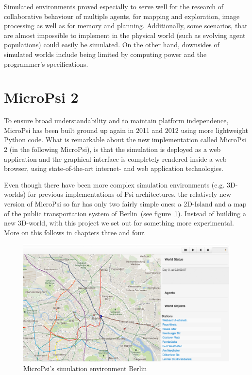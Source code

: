 Simulated environments proved especially to serve well for the research of collaborative behaviour of multiple agents, for mapping and exploration, image processing as well as for memory and planning. Additionally, some scenarios, that are almost impossible to implement in the physical world (such as evolving agent populations) could easily be simulated. On the other hand, downsides of simulated worlds include being limited by computing power and the programmer's specifications.~\cite{Bach:2009:PSI:1611304}

    \section{MicroPsi 2}
    \label{sec:2:MicroPsi}
To ensure broad understandability and to maintain platform independence, MicroPsi has been built ground up again in 2011 and 2012 using more lightweight Python code. What is remarkable about the new implementation called MicroPsi 2 (in the following MicroPsi), is that the simulation is deployed as a web application and the graphical interface is completely rendered inside a web browser, using state-of-the-art internet- and web application technologies.~\cite{conf/agi/Bach12}
        
Even though there have been more complex simulation environments (e.g. 3D-worlds) for previous implementations of Psi architectures, the relatively new version of MicroPsi so far has only two fairly simple ones: a 2D-Island and a map of the public transportation system of Berlin~(see figure~\ref{mp2_berlin}). Instead of building a new 3D-world, with this project we set out for something more experimental. More on this follows in chapters three and four.

\begin{figure}[h]
  \centering
    \includegraphics[width=14cm]{graphics/mp2_berlin}
  \caption{MicroPsi's simulation environment Berlin}
  \label{mp2_berlin}
\end{figure}

